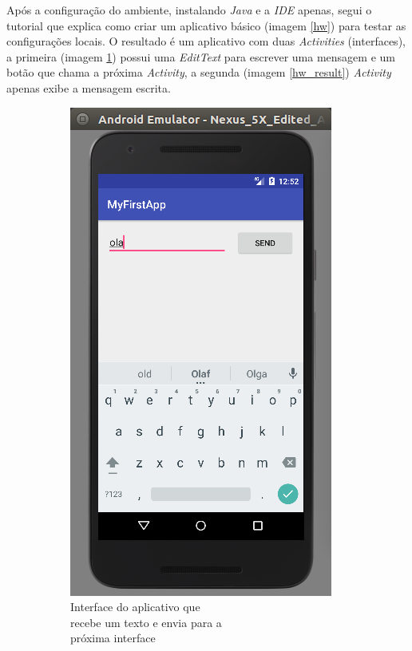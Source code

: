 \documentclass[hidelinks,12pt]{article}
\begin{document}
Ap\'os a configura\c{c}\~ao do ambiente, instalando \textit{Java} e a \textit{IDE} apenas, segui o tutorial \cite{androidhw} que explica como criar um aplicativo b\'asico (imagem \ref{hw}) para testar as configura\c{c}\~oes locais. O resultado \'e um aplicativo com duas \textit{Activities} (interfaces), a primeira (imagem \ref*{hw_message}) possui uma \textit{EditText} para escrever uma mensagem e um bot\~ao que chama a pr\'oxima \textit{Activity}, a segunda (imagem \ref*{hw_result}) \textit{Activity} apenas exibe a mensagem escrita.
\begin{figure}[H]
	\begin{subfigure}{0.5\textwidth}
		\includegraphics[scale=0.5]{hw_message} 
		\caption{Interface do aplicativo que\\\hspace{\textwidth}recebe um texto e envia para a \\\hspace{\textwidth}pr\'oxima interface}
		\label{hw_message}
	\end{subfigure}
	\begin{subfigure}{0.5\textwidth}

\end{subfigure}
\end{figure}
\end{document}
